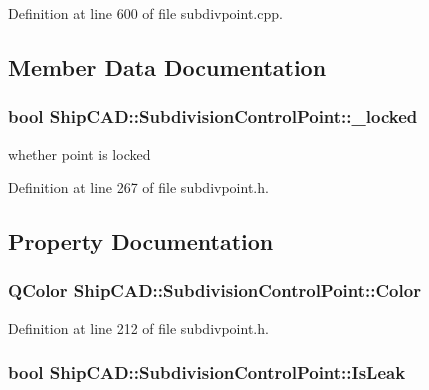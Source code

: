 Definition at line 600 of file subdivpoint.\-cpp.



\subsection{Member Data Documentation}
\hypertarget{classShipCAD_1_1SubdivisionControlPoint_acf4dc0c2a3d4c52847c68a8a412669f5}{
\subsubsection[{\-\_\-locked}]{\setlength{\rightskip}{0pt plus 5cm}bool Ship\-C\-A\-D\-::\-Subdivision\-Control\-Point\-::\-\_\-locked\hspace{0.3cm}{\ttfamily [protected]}}}\label{classShipCAD_1_1SubdivisionControlPoint_acf4dc0c2a3d4c52847c68a8a412669f5}
whether point is locked 

Definition at line 267 of file subdivpoint.\-h.



\subsection{Property Documentation}
\hypertarget{classShipCAD_1_1SubdivisionControlPoint_a8c7a97ce5194163f37a4b655f87bc309}{
\subsubsection[{Color}]{\setlength{\rightskip}{0pt plus 5cm}Q\-Color Ship\-C\-A\-D\-::\-Subdivision\-Control\-Point\-::\-Color\hspace{0.3cm}{\ttfamily [read]}}}\label{classShipCAD_1_1SubdivisionControlPoint_a8c7a97ce5194163f37a4b655f87bc309}


Definition at line 212 of file subdivpoint.\-h.

\hypertarget{classShipCAD_1_1SubdivisionControlPoint_a33a15d8a83f43369313d57a854046ff7}{
\subsubsection[{Is\-Leak}]{\setlength{\rightskip}{0pt plus 5cm}bool Ship\-C\-A\-D\-::\-Subdivision\-Control\-Point\-::\-Is\-Leak\hspace{0.3cm}{\ttfamily [read]}}}\label{classShipCAD_1_1SubdivisionControlPoint_a33a15d8a83f43369313d57a854046ff7}


